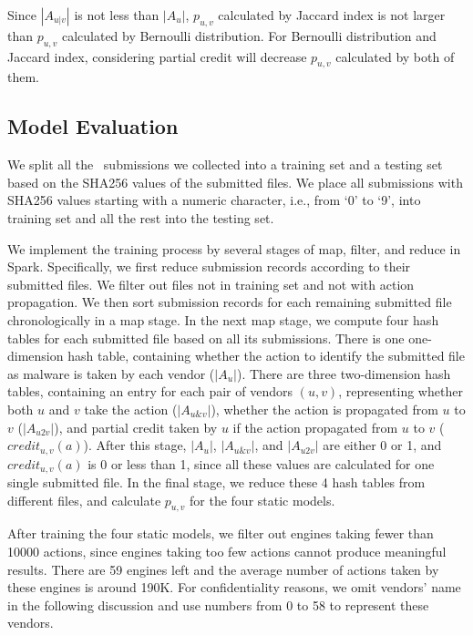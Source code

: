 Since $|A_{u|v}|$ is not less than $|A_u|$, 
$p_{u,v}$ calculated by Jaccard index is not larger than $p_{u,v}$ calculated by Bernoulli distribution. 
For Bernoulli distribution and Jaccard index, 
considering partial credit will decrease $p_{u,v}$ calculated by both of them. 


\subsection{Model Evaluation}
\label{sec:predict}



We split all the \pe\ submissions we collected into a training set and a testing set based on the SHA256 values of the submitted files. 
We place all submissions with SHA256 values starting with a numeric character, 
i.e., from `0' to `9', into training set
and all the rest into the testing set.

We implement the training process by several stages of map, filter, and reduce in Spark. 
Specifically, we first reduce submission records according to their submitted files. 
We filter out files not in training set and not with action propagation. 
We then sort submission records for each remaining submitted file chronologically in a map stage.
In the next map stage, we compute four hash tables for each submitted file based on all its submissions.   
There is one one-dimension hash table, containing whether the action to identify the submitted file as malware is taken by each vendor ($|A_{u}|$). 
There are three two-dimension hash tables, 
containing an entry for each pair of vendors $(u,v)$, 
representing whether both $u$ and $v$ take the action ($|A_{u\&v}|$),  
whether the action is propagated from $u$ to $v$ ($|A_{u2v}|$),
and partial credit taken by $u$ if the action propagated from $u$ to $v$ ($credit_{u,v}(a)$).
After this stage, $|A_{u}|$, $|A_{u\&v}|$, and $|A_{u2v}|$ are either 0 or 1,
and $credit_{u,v}(a)$ is 0 or less than 1, since all these values are calculated for one single submitted file. 
In the final stage, 
we reduce these 4 hash tables from different files,
and calculate $p_{u,v}$ for the four static models. 




After training the four static models, 
we filter out engines taking fewer than 10000 actions,
since engines taking too few actions cannot produce meaningful results.
There are 59 engines left
and the average number of actions taken by these engines is around 190K. %
For confidentiality reasons, we omit vendors' name in the following discussion
and use numbers from 0 to 58 to represent these vendors.

